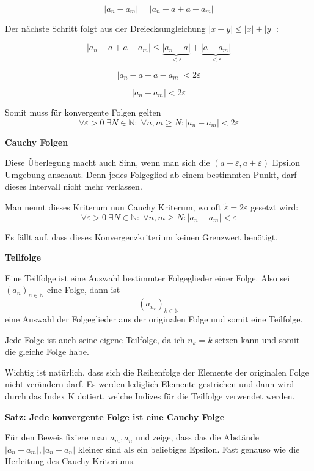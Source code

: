 \documentclass[headsepline,12pt,a4paper]{scrartcl}
\begin{document}
$$|a_n-a_m| = |a_n-a + a-a_m|$$

Der nächste Schritt folgt aus der Dreiecksungleichung $ |x+y| \leq |x| + |y| $ : 

$$ |a_n-a + a-a_m| \leq \underbrace{|a_n-a|}_{<\varepsilon} + \underbrace{|a-a_m|}_{<\varepsilon} $$

$$ |a_n-a + a-a_m| < 2\varepsilon $$

$$ |a_n-a_m| < 2\varepsilon $$

\item Somit muss für konvergente Folgen gelten 
$$ \forall \varepsilon > 0 \; \exists N \in \mathbb{N} : \; \forall n,m \geq N : |a_n-a_m| < 2\varepsilon $$

\newpage
\begin{center}
\item[\textbf{Cauchy Folgen}]
\end{center}
\item Diese Überlegung macht auch Sinn, wenn man sich die ${\displaystyle (a-\varepsilon ,a+\varepsilon )} $ Epsilon Umgebung anschaut. Denn jedes Folgeglied ab einem bestimmten Punkt, darf dieses Intervall nicht mehr verlassen. \\
\item Man nennt dieses Kriterum nun Cauchy Kriterum, wo oft $ \tilde{\varepsilon} = 2\varepsilon$ gesetzt wird:
$$ \forall \varepsilon > 0 \; \exists N \in \mathbb{N} : \; \forall n,m \geq N : |a_n-a_m| < \varepsilon $$

Es fällt auf, dass dieses Konvergenzkriterium keinen Grenzwert benötigt.

\begin{center}
\item[\textbf{Teilfolge}]
\end{center}
\item Eine Teilfolge ist eine Auswahl bestimmter Folgeglieder einer Folge. Also sei $ (a_n)_{n \in \mathbb{N}} $ eine Folge, dann ist 
$$  (a_{n_\varepsilon})_{k \in \mathbb{N}} $$ eine Auswahl der Folgeglieder aus der originalen Folge und somit eine Teilfolge.
\item Jede Folge ist auch seine eigene Teilfolge, da ich $n_k =k$ setzen kann und somit die gleiche Folge habe.
\item Wichtig ist natürlich, dass sich die Reihenfolge der Elemente der originalen Folge nicht verändern darf. Es werden lediglich Elemente gestrichen und dann wird durch das Index K dotiert, welche Indizes für die Teilfolge verwendet werden.


\begin{center}
\item[\textbf{Satz: Jede konvergente Folge ist eine Cauchy Folge}]
\end{center}
\item Für den Beweis fixiere man $a_m,a_n$ und zeige, dass das die Abstände $|a_n-a_m|,|a_n-a_n|$ kleiner sind als ein beliebiges Epsilon. Fast genauso 
wie die Herleitung des Cauchy Kriteriums.
\end{document}
